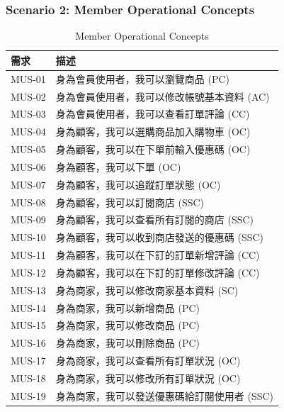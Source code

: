\documentclass[a4paper, 12pt]{article}
\begin{document}
\subsubsection{Scenario 2: Member Operational Concepts}
\begin{table}[h]
    \centering
    \renewcommand{\arraystretch}{1.35}
    \begin{tabular}{|p{3cm}|p{10cm}|}
        \hline
        \textbf{需求} & \textbf{描述} \\
        \hline
        MUS-01 & 身為會員使用者，我可以瀏覽商品 (PC) \\
        \hline
        MUS-02 & 身為會員使用者，我可以修改帳號基本資料 (AC) \\
        \hline
        MUS-03 & 身為會員使用者，我可以查看訂單評論 (CC) \\
        \hline
        MUS-04 & 身為顧客，我可以選購商品加入購物車 (OC) \\
        \hline
        MUS-05 & 身為顧客，我可以在下單前輸入優惠碼 (OC) \\
        \hline
        MUS-06 & 身為顧客，我可以下單 (OC) \\
        \hline
        MUS-07 & 身為顧客，我可以追蹤訂單狀態 (OC) \\
        \hline
        MUS-08 & 身為顧客，我可以訂閱商店 (SSC) \\
        \hline
        MUS-09 & 身為顧客，我可以查看所有訂閱的商店 (SSC) \\
        \hline
        MUS-10 & 身為顧客，我可以收到商店發送的優惠碼 (SSC) \\
        \hline
        MUS-11 & 身為顧客，我可以在下訂的訂單新增評論 (CC) \\
        \hline
        MUS-12 & 身為顧客，我可以在下訂的訂單修改評論 (CC) \\
        \hline
        MUS-13 & 身為商家，我可以修改商家基本資料 (SC) \\
        \hline
        MUS-14 & 身為商家，我可以新增商品 (PC) \\
        \hline
        MUS-15 & 身為商家，我可以修改商品 (PC) \\
        \hline
        MUS-16 & 身為商家，我可以刪除商品 (PC) \\
        \hline
        MUS-17 & 身為商家，我可以查看所有訂單狀況 (OC) \\
        \hline
        MUS-18 & 身為商家，我可以修改所有訂單狀況 (OC) \\
        \hline
        MUS-19 & 身為商家，我可以發送優惠碼給訂閱使用者 (SSC) \\
        \hline
    \end{tabular}
    \caption{Member Operational Concepts}
    \label{tab:member-user-stories-requirements}
\end{table}
\newpage
\end{document}
